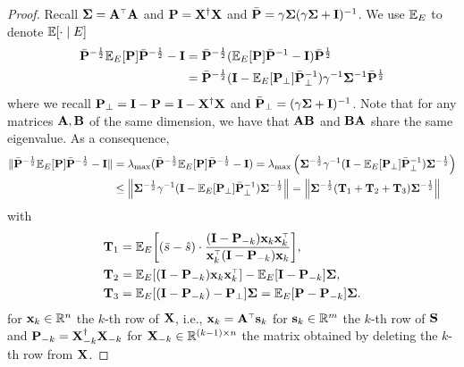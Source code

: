 \documentclass[11pt]{article}
\begin{document}
\begin{proof}
Recall $\Sigmab = \A^\top \A$ and $\P = \X^\dagger \X$ and $\bar\P= \gamma\Sigmab
(\gamma\Sigmab+\I)^{-1}$. We use $\E_E$ to denote $\E[\cdot\mid E]$
   \begin{align*}
     \bar\P^{-\frac12}\E_E[\P]\bar\P^{-\frac12} - \I
     &=\bar\P^{-\frac12}(\E_E[\P]\bar\P^{-1} - \I)\bar\P^{\frac12}
     \\
     &=\bar\P^{-\frac12}(\I-\E_E[\P_\perp]\bar\P_\perp^{-1})\gamma^{-1}\Sigmab^{-1}\bar\P^{\frac12}
   \end{align*}
   where we recall $\P_\perp = \I - \P = \I - \X^\dagger \X$ and $\bar \P_\perp = (\gamma \Sigmab + \I)^{-1}$. Note that for any matrices $\A, \B$ of the same dimension, we have that $\A\B$ and $\B \A$ share the same eigenvalue. As a consequence, 
  \begin{align*}
    \| \bar\P^{-\frac12}\E_E[\P]\bar\P^{-\frac12} - \I \| &= \lambda_{\max} (\bar\P^{-\frac12}\E_E[\P]\bar\P^{-\frac12} - \I) = \lambda_{\max} \left( \Sigmab^{-\frac12} \gamma^{-1}( \I - \E_E[\P_\perp] \bar \P_\perp^{-1}) \Sigmab^{-\frac12} \right) \\
    & \le \left\| \Sigmab^{-\frac12} \gamma^{-1}( \I - \E_E[\P_\perp] \bar \P_\perp^{-1}) \Sigmab^{-\frac12} \right\| = \left\| \Sigmab^{-\frac12} (\T_1 + \T_2 + \T_3) \Sigmab^{-\frac12} \right\|
  \end{align*}
  with
   \begin{align*}
     \T_1
     &= \E_E\bigg[(\bar s - \hat s)\cdot
            \frac{ ( \I - \P_{-k}) \x_k\x_k^\top}{\x_k^\top ( \I - \P_{-k}) \x_k}\bigg],
     \\
     \T_2 
     &=\E_E[ ( \I - \P_{-k}) \x_k\x_k^\top] - \E_E[\I - \P_{-k}]\Sigmab,
     \\
     \T_3
     &=\E_E[ (\I - \P_{-k}) - \P_\perp]\Sigmab = \E_E[ \P - \P_{-k}]\Sigmab.
   \end{align*}
   for $\x_k \in \R^n$ the $k$-th row of $\X$, i.e., $\x_k = \A^\top \s_k$ for $\s_k \in \R^m$ the $k$-th row of $\S$ and $\P_{-k} = \X_{-k}^\dagger \X_{-k}$ for $\X_{-k} \in \R^{(k-1) \times n}$ the matrix obtained by deleting the $k$-th row from $\X$.


\end{proof}
\end{document}
